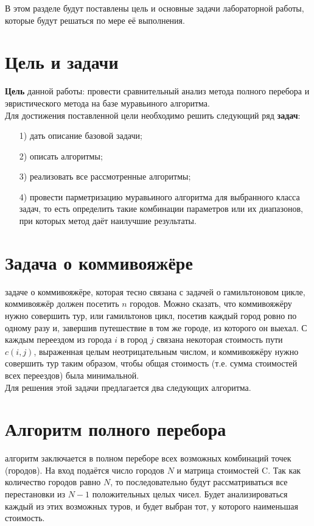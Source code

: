 В этом разделе будут поставлены цель и основные задачи лабораторной работы, которые будут решаться по мере её выполнения.

\section{Цель и задачи}
\qquad\textbf{Цель} данной работы: провести сравнительный анализ метода полного перебора и эвристического метода на базе муравьиного алгоритма.\\

Для достижения поставленной цели необходимо решить следующий ряд \textbf{задач}:
\begin{enumerate}
	\item[1)] дать описание базовой задачи;
	\item[2)] описать алгоритмы;
	\item[3)] реализовать все рассмотренные алгоритмы;
	\item[4)] провести парметризацию муравьиного алгоритма для выбранного класса задач, то есть определить такие комбинации параметров или их диапазонов, при которых метод даёт наилучшие результаты.
\end{enumerate}

\section{Задача о коммивояжёре}
 задаче о коммивояжёре, которая тесно связана с задачей о гамильтоновом цикле, коммивояжёр должен посетить $n$ городов. Можно сказать, что коммивояжёру нужно совершить тур, или гамильтонов цикл, посетив каждый город ровно по одному разу и, завершив путешествие в том же городе, из которого он выехал. С каждым переездом из города $i$ в город $j$ связана некоторая стоимость пути $c(i, j)$, выраженная целым неотрицательным числом, и коммивояжёру нужно совершить тур таким образом, чтобы общая стоимость (т.е. сумма стоимостей всех переездов) была минимальной. \cite{cite_travsale}\\

Для решения этой задачи предлагается два следующих алгоритма.

\section{Алгоритм полного перебора}
 алгоритм заключается в полном переборе всех возможных комбинаций точек (городов). На вход подаётся число городов $N$ и матрица стоимостей C. Так как количество городов равно $N$, то последовательно будут рассматриваться все перестановки из $N - 1$ положительных целых чисел. Будет анализироваться каждый из этих возможных туров, и будет выбран тот, у которого наименьшая стоимость. \cite{Kormen}

